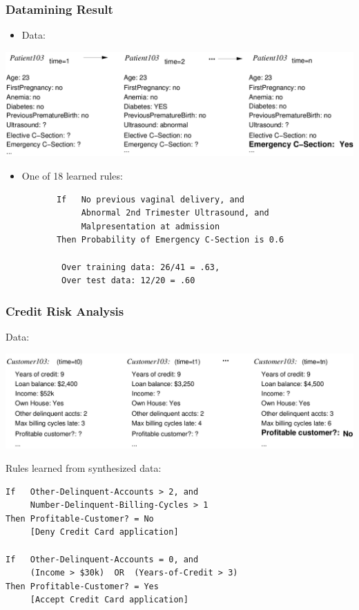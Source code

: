 \documentclass{beamer}
\begin{document}
\begin{frame}[fragile]
\frametitle{Datamining Result}
\label{sec-2-3}


\begin{itemize}
\item Data:
\end{itemize}

\includegraphics[width=.9\linewidth]{./image/csec.png}

\begin{itemize}
\item One of 18 learned rules:
       \begin{verbatim}
       If   No previous vaginal delivery, and
            Abnormal 2nd Trimester Ultrasound, and
            Malpresentation at admission
       Then Probability of Emergency C-Section is 0.6
       
        Over training data: 26/41 = .63, 
        Over test data: 12/20 = .60
       \end{verbatim}
\end{itemize}
\end{frame}
\begin{frame}[fragile]
\frametitle{Credit Risk Analysis}
\label{sec-2-4}

Data:

\includegraphics[width=.9\linewidth]{./image/credit-outcomes.png}

Rules learned from synthesized data:
\begin{verbatim}
If   Other-Delinquent-Accounts > 2, and
     Number-Delinquent-Billing-Cycles > 1
Then Profitable-Customer? = No
     [Deny Credit Card application]

If   Other-Delinquent-Accounts = 0, and
     (Income > $30k)  OR  (Years-of-Credit > 3)
Then Profitable-Customer? = Yes
     [Accept Credit Card application]
\end{verbatim}
\end{frame}
\end{document}
